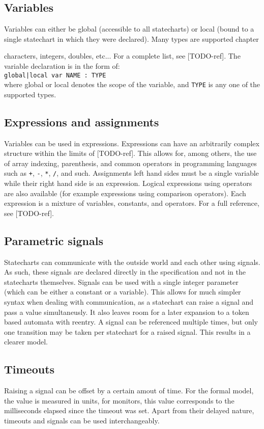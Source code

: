 \documentclass{book}
\begin{document}
  \subsection{Variables}
Variables can either be global (accessible to all statecharts) or local (bound to a single statechart in which they were declared). Many types are supported chapter{ characters, integers, doubles, etc... For a complete list, see [TODO-ref]. The variable declaration is in the form of: \\\verb!global|local var NAME : TYPE!\\ where global or local denotes the scope of the variable, and \verb!TYPE! is any one of the supported types.
  \subsection{Expressions and assignments}
Variables can be used in expressions. Expressions can have an arbitrarily complex structure within the limits of [TODO-ref]. This allows for, among others, the use of array indexing, parenthesis, and common operators in programming languages such as \verb!+!, \verb!-!, \verb!*!, \verb!/!, and such. Assignments left hand sides must be a single variable while their right hand side is an expression. Logical expressions using operators are also available (for example expressions using comparison operators). Each expression is a mixture of variables, constants, and operators. For a full reference, see [TODO-ref].
  \subsection{Parametric signals}
Statecharts can communicate with the outside world and each other using signals. As such, these signals are declared directly in the specification and not in the statecharts themselves. Signals can be used with a single integer parameter (which can be either a constant or a variable). This allows for much simpler syntax when dealing with communication, as a statechart can raise a signal and pass a value simultaneusly. It also leaves room for a later expansion to a token based automata with reentry.
A signal can be referenced multiple times, but only one transition may be taken per statechart for a raised signal. This results in a clearer model.
  \subsection{Timeouts}
Raising a signal can be offset by a certain amout of time. For the formal model, the value is measured in units, for monitors, this value corresponds to the milliseconds elapsed since the timeout was set. Apart from their delayed nature, timeouts and signals can be used interchangeably.
}
\end{document}
